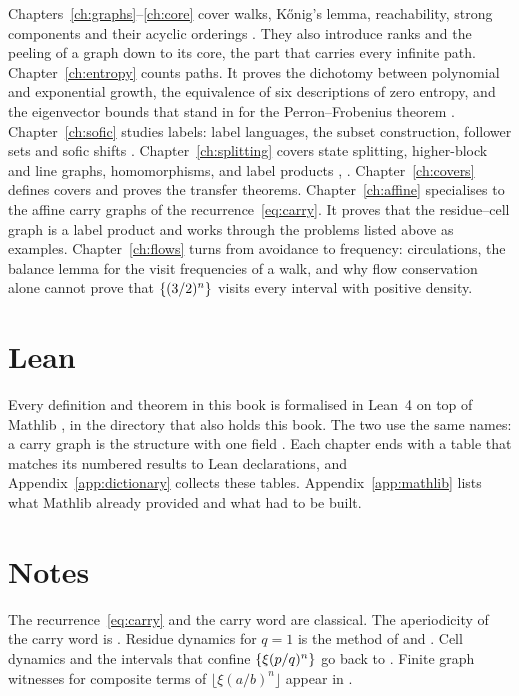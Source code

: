 Chapters~\ref{ch:graphs}--\ref{ch:core} cover walks, Kőnig's lemma, reachability, strong
components and their acyclic orderings \cite[§1.4--1.5]{BJG09}. They also introduce ranks
and the peeling of a graph down to its core, the part that carries every infinite path.
Chapter~\ref{ch:entropy} counts paths. It proves the dichotomy between polynomial and
exponential growth, the equivalence of six descriptions of zero entropy, and the
eigenvector bounds that stand in for the Perron--Frobenius theorem \cite[§4.1--4.4,
§5.3]{LM95}. Chapter~\ref{ch:sofic} studies labels: label languages, the subset
construction, follower sets and sofic shifts \cite[ch.~3]{LM95}. Chapter~\ref{ch:splitting}
covers state splitting, higher-block and line graphs, homomorphisms, and label products
\cite[§2.3--2.4]{LM95}, \cite[§4.5]{BJG09}. Chapter~\ref{ch:covers} defines covers and
proves the transfer theorems. Chapter~\ref{ch:affine} specialises to the affine carry graphs
of the recurrence~\eqref{eq:carry}. It proves that the residue--cell graph is a label
product and works through the problems listed above as examples. Chapter~\ref{ch:flows} turns from
avoidance to frequency: circulations, the balance lemma for the visit frequencies of a walk,
and why flow conservation alone cannot prove that \(\{(3/2)^n\}\) visits every interval with
positive density.

\section{Lean}

Every definition and theorem in this book is formalised in Lean~4 on top of Mathlib
\cite{Mathlib}, in the directory that also holds this book. The two use the same names:
a carry graph is the structure  with one field
. Each chapter ends with a table that matches its numbered
results to Lean declarations, and Appendix~\ref{app:dictionary} collects these tables.
Appendix~\ref{app:mathlib} lists what Mathlib already provided and what had to be built.

\section*{Notes}
The recurrence~\eqref{eq:carry} and the carry word are classical. The aperiodicity of the
carry word is \cite[Lemma~2]{DN05}. Residue dynamics for \(q=1\) is the method of
\cite{FS67} and \cite{Dub09}. Cell dynamics and the intervals that confine
\(\{\xi(p/q)^n\}\) go back to \cite{FLP95}. Finite graph witnesses for composite terms of
\(\lfloor\xi(a/b)^n\rfloor\) appear in \cite{Oda26}.
